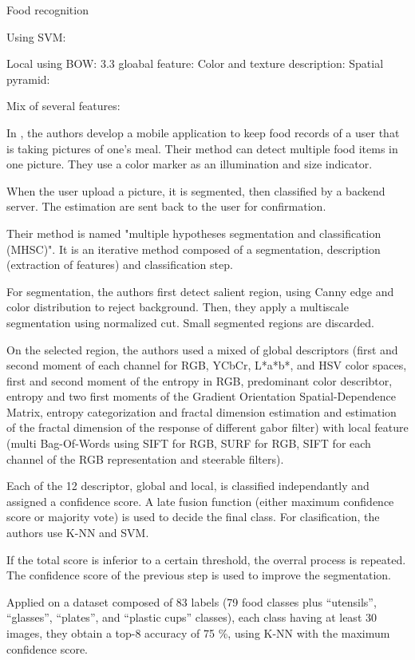 Food recognition

Using SVM:

Local using BOW: 3.3
gloabal feature:
Color and texture description: 
Spatial pyramid:

Mix of several features:

In \cite{Zhu2015}, the authors develop a mobile application to keep food records of a user that is taking pictures of one's meal. Their method can detect multiple food items in one picture. They use a color marker as an illumination and size indicator.

When the user upload a picture, it is segmented, then classified by a backend server. The estimation are sent back to the user for confirmation.

Their method is named "multiple hypotheses segmentation and classification (MHSC)". It is an iterative method composed of a segmentation, description (extraction of features) and classification step.

For segmentation, the authors first detect salient region, using Canny edge and color distribution to reject background. Then, they apply a multiscale segmentation using normalized cut. Small segmented regions are discarded.

On the selected region, the authors used a mixed of global descriptors (first and second moment of each channel for RGB, YCbCr, L*a*b*, and HSV color spaces, first and second moment of the entropy in RGB, predominant color describtor, entropy and two first moments of the Gradient Orientation Spatial-Dependence Matrix, entropy categorization and fractal dimension estimation and estimation of the fractal dimension of the response of different gabor filter) with local feature (multi Bag-Of-Words using SIFT for RGB, SURF for RGB, SIFT for each channel of the RGB representation and steerable filters).

Each of the 12 descriptor, global and local, is classified independantly and assigned a confidence score. A late fusion function (either maximum confidence score or majority vote) is used  to decide the final class. For clasification, the authors use K-NN and SVM.

If the total score is inferior to a certain threshold, the overral process is repeated. The confidence score of the previous step is used to improve the segmentation.

Applied on a dataset composed of 83 labels (79 food classes plus \enquote{utensils}, \enquote{glasses}, \enquote{plates}, and \enquote{plastic cups} classes), each class having at least 30 images, they obtain a top-8 accuracy of 75 \%, using K-NN with the maximum confidence score.

